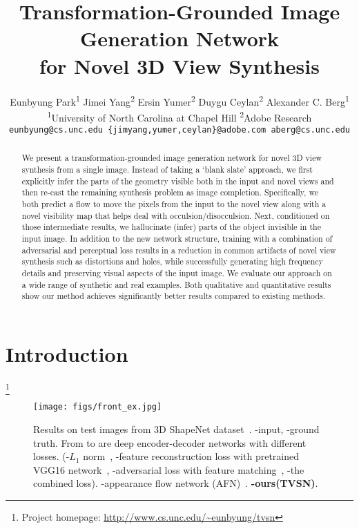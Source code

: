 \documentclass[10pt,twocolumn,letterpaper]{article}
\newcommand\Mark[1]{\textsuperscript{#1}}
\newcommand\blfootnote[1]{%
  \begingroup
  \renewcommand\thefootnote{}\footnote{#1}%
  \addtocounter{footnote}{-1}%
  \endgroup
}
\begin{document}
\title{Transformation-Grounded Image Generation Network\\for Novel 3D View Synthesis}

\author{Eunbyung Park\Mark{1} \quad Jimei Yang\Mark{2} \quad Ersin Yumer\Mark{2} \quad Duygu Ceylan\Mark{2} \quad Alexander C. Berg\Mark{1}\\
\Mark{1}University of North Carolina at Chapel Hill \quad \Mark{2}Adobe Research\\
{\tt\small eunbyung@cs.unc.edu \quad \{jimyang,yumer,ceylan\}@adobe.com \quad aberg@cs.unc.edu}}

\maketitle

\begin{abstract}
We present a transformation-grounded image generation network for novel 3D view synthesis from a single image. Instead of taking a `blank slate' approach, we first explicitly infer the parts of the geometry visible both in the input and novel views and then re-cast the remaining synthesis problem as image completion. Specifically, we both predict a flow to move the pixels from the input to the novel view along with a novel visibility map that helps deal with occulsion/disocculsion. Next, conditioned on those intermediate results, we hallucinate (infer) parts of the object invisible in the input image. In addition to the new network structure, training with a combination of adversarial and perceptual loss results in a reduction in common artifacts of novel view synthesis such as distortions and holes, while successfully generating high frequency details and preserving visual aspects of the input image. We evaluate our approach on a wide range of synthetic and real examples. Both qualitative and quantitative results show our method achieves significantly better results compared to existing methods.
\end{abstract}

\section{Introduction}
\blfootnote{Project homepage: \url{http://www.cs.unc.edu/~eunbyung/tvsn}}
\begin{figure*}[t]
\begin{center}
\texttt{[image: figs/front\_ex.jpg]}
\label{fig:teaser}
\end{center}
\caption{Results on test images from 3D ShapeNet dataset~\cite{shapenet2015}. -input, -ground truth. From  to  are deep encoder-decoder networks with different losses. (-$L_1$ norm~\cite{tatarchenko_eccv2016}, -feature reconstruction loss with pretrained VGG16 network~\cite{johnson_eccv2016,larsen_icml2016,ulyanov_icml2016,lamb2016discriminative}, -adversarial loss with feature matching~\cite{Goodfellow_nips2014,Radford_iclr2016,salimans_nips2016}, -the combined loss). -appearance flow network (AFN)~\cite{Zhou_eccv2016}. \textbf{-ours(TVSN)}.}
\label{fig:front_ex}
\end{figure*}
\end{document}
